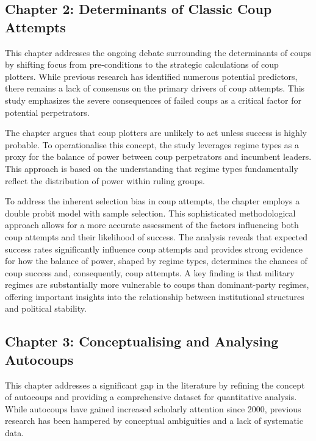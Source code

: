 \documentclass[
  12pt,
]{report}
\begin{document}
\subsection*{Chapter 2: Determinants of Classic Coup
Attempts}\label{chapter-2-determinants-of-classic-coup-attempts}

This chapter addresses the ongoing debate surrounding the determinants
of coups by shifting focus from pre-conditions to the strategic
calculations of coup plotters. While previous research has identified
numerous potential predictors, there remains a lack of consensus on the
primary drivers of coup attempts. This study emphasizes the severe
consequences of failed coups as a critical factor for potential
perpetrators.

The chapter argues that coup plotters are unlikely to act unless success
is highly probable. To operationalise this concept, the study leverages
regime types as a proxy for the balance of power between coup
perpetrators and incumbent leaders. This approach is based on the
understanding that regime types fundamentally reflect the distribution
of power within ruling groups.

To address the inherent selection bias in coup attempts, the chapter
employs a double probit model with sample selection. This sophisticated
methodological approach allows for a more accurate assessment of the
factors influencing both coup attempts and their likelihood of success.
The analysis reveals that expected success rates significantly influence
coup attempts and provides strong evidence for how the balance of power,
shaped by regime types, determines the chances of coup success and,
consequently, coup attempts. A key finding is that military regimes are
substantially more vulnerable to coups than dominant-party regimes,
offering important insights into the relationship between institutional
structures and political stability.

\subsection*{Chapter 3: Conceptualising and Analysing
Autocoups}\label{chapter-3-conceptualising-and-analysing-autocoups}

This chapter addresses a significant gap in the literature by refining
the concept of autocoups and providing a comprehensive dataset for
quantitative analysis. While autocoups have gained increased scholarly
attention since 2000, previous research has been hampered by conceptual
ambiguities and a lack of systematic data.
\end{document}
